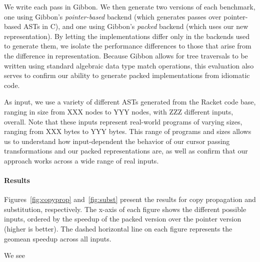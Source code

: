 \documentclass[a4paper,english]{lipics-v2016}
\newcommand{\treelang}{Gibbon\xspace} %
\begin{document}
We write each pass in \treelang{}. We then generate two versions of each
benchmark, one using \treelang{}'s {\em pointer-based} backend (which
generates passes over pointer-based ASTs in C), and one using \treelang{}'s
{\em packed} backend (which uses our new representation). By letting the
implementations differ only in the backends used to generate them, we isolate
the performance differences to those that arise from the difference in
representation. Because \treelang{} allows for tree traversals to be written
using standard algebraic data type match operations, this evaluation also
serves to confirm our ability to generate packed implementations from
idiomatic code.

As input, we use a variety of different ASTs generated from the Racket code
base, ranging in size from XXX nodes to YYY nodes, with ZZZ different inputs,
overall. Note that these inputs represent real-world programs of varying
sizes, ranging from XXX bytes to YYY bytes. This range of programs and sizes
allows us to understand how input-dependent the behavior of our cursor passing
transformations and our packed representations are, as well as confirm that
our approach works across a wide range of real inputs.

\paragraph*{Results}
Figures~\ref{fig:copyprop} and~\ref{fig:subst} present the results
for copy propagation and substitution, respectively. The x-axis of each figure
shows the different possible inputs, ordered by the speedup of the packed
version over the pointer version (higher is better). The dashed horizontal
line on each figure represents the geomean speedup across all inputs.

We see 




\end{document}
